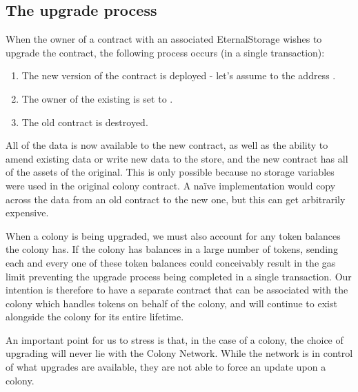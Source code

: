\subsection{The upgrade process}

When the owner of a contract with an associated EternalStorage wishes to upgrade the contract, the following process occurs (in a single transaction):

\begin{enumerate}
\item The new version of the contract is deployed - let's assume to the address .
\item The owner of the existing  is set to .
\item The old contract is destroyed.
\end{enumerate}

All of the data is now available to the new contract, as well as the ability to amend existing data or write new data to the store, and the new contract has all of the assets of the original. This is only possible because no storage variables were used in the original colony contract. A na{\"i}ve implementation would copy across the data from an old contract to the new one, but this can get arbitrarily expensive.

When a colony is being upgraded, we must also account for any token balances the colony has. If the colony has balances in a large number of tokens, sending each and every one of these token balances could conceivably result in the gas limit preventing the upgrade process being completed in a single transaction. Our intention is therefore to have a separate contract that can be associated with the colony which handles tokens on behalf of the colony, and will continue to exist alongside the colony for its entire lifetime.

An important point for us to stress is that, in the case of a colony, the choice of upgrading will never lie with the Colony Network. While the network is in control of what upgrades are available, they are not able to force an update upon a colony.